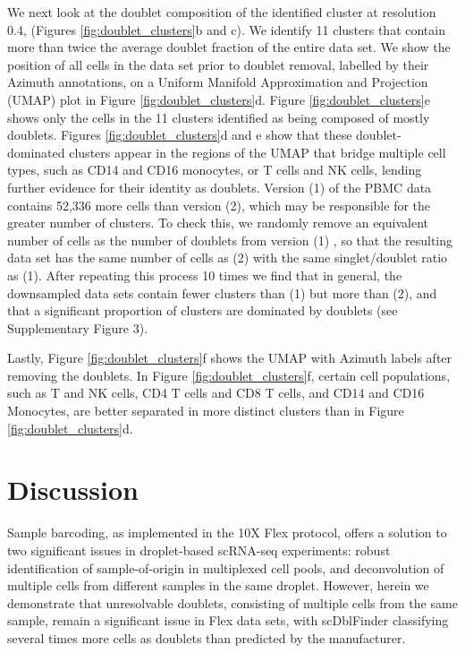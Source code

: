 \documentclass[unnumsec,webpdf,modern,large]{oup-authoring-template}
\begin{document}
	We next look at the doublet composition of the identified cluster at resolution 0.4, (Figures \ref{fig:doublet_clusters}b and c). 
	We identify 11 clusters that contain more than twice the average doublet fraction of the entire data set. 
	 We show the position of all cells in the data set prior to doublet removal, labelled by their Azimuth annotations, on a Uniform Manifold Approximation and Projection (UMAP) plot in Figure \ref{fig:doublet_clusters}d. 
	 Figure \ref{fig:doublet_clusters}e shows only the cells in the 11 clusters identified as being composed of mostly doublets.
	 Figures \ref{fig:doublet_clusters}d and e show that these doublet-dominated clusters appear in the regions of the UMAP that bridge multiple cell types, such as CD14 and CD16 monocytes, or T cells and NK cells, lending further evidence for their identity as doublets. 
	 Version (1) of the PBMC data  contains 52,336 more cells than version (2), which may be responsible for the greater number of clusters. 
	 To check this, we randomly remove an equivalent number of cells as the number of doublets from version (1) , so that the resulting data set has the same number of cells as (2) with the same singlet/doublet ratio as (1). 
	 After repeating this process 10 times we find that in general, the downsampled data sets contain fewer clusters than (1) but more than (2), and that a significant proportion of clusters are dominated by doublets (see Supplementary Figure 3).	 
	 
	 Lastly, Figure  \ref{fig:doublet_clusters}f shows the UMAP with Azimuth labels after removing the doublets. 
	 In Figure  \ref{fig:doublet_clusters}f, certain cell populations, such as T and NK cells, CD4 T cells and CD8 T cells, and CD14 and CD16 Monocytes, are better separated in more distinct clusters than in Figure  \ref{fig:doublet_clusters}d.
	
	\section{Discussion}
	\label{sec:discussion}
	
	Sample barcoding, as implemented in the 10X Flex protocol, offers a solution to two significant issues in droplet-based scRNA-seq experiments: robust identification of sample-of-origin in multiplexed cell pools, and deconvolution of multiple cells from different samples in the same droplet. 
	However, herein we demonstrate that unresolvable doublets, consisting of multiple cells from the same sample, remain a significant issue in Flex data sets, with scDblFinder classifying several times more cells as doublets than predicted by the manufacturer. 
	
\end{document}
